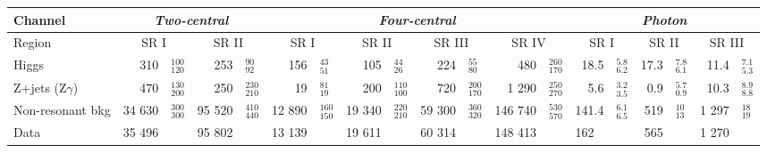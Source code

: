 \documentclass[PAPER, american,coverpage,texlive=2016, english]{\ATLASLATEXPATH atlasdoc}
\providecommand{\DIFaddendFL}{} %
\begin{document}
\begin{table}[htbp]
{   \begin{tabular}{ l |r@{$^{+}_{-}$}l|r@{$^{+}_{-}$}l|r@{$^{+}_{-}$}l|r@{$^{+}_{-}$}l|r@{$^{+}_{-}$}l|r@{$^{+}_{-}$}l|r@{$^{+}_{-}$}l|r@{$^{+}_{-}$}l|r@{$^{+}_{-}$}l}
\hline
\hline
Channel      & \multicolumn{4}{c|}{\textit{Two-central}} & \multicolumn{8}{c|}{\textit{Four-central}} & \multicolumn{6}{c}{\textit{Photon}} \\ \hline
Region       & \multicolumn{2}{c|}{SR I}           & \multicolumn{2}{c|}{SR II  }         & \multicolumn{2}{c|}{SR I }  & \multicolumn{2}{c|}{SR II} & \multicolumn{2}{c|}{SR III} & \multicolumn{2}{c|}{SR IV}  & \multicolumn{2}{c|}{SR I}  & \multicolumn{2}{c|}{SR II}   & \multicolumn{2}{c}{SR III}   \\
\hline
Higgs & 310&$^{100}_{120}$ & 253&$^{90}_{92}$ & 156&$^{43}_{51}$ & 105&$^{44}_{26}$ & 224&$^{55}_{80}$ & 480&$^{260}_{170}$ & 18.5&$^{5.8}_{6.2}$ & 17.3&$^{7.8}_{6.1}$ & 11.4&$^{7.1}_{5.3}$ \\
Z+jets (Z$\gamma$) & 470&$^{130}_{200}$ & 250&$^{230}_{210}$ & 19&$^{81}_{19}$ & 200&$^{110}_{100}$ & 720&$^{200}_{170}$ & 1 290&$^{250}_{270}$ & 5.6&$^{3.2}_{3.5}$ & 0.9&$^{5.7}_{0.9}$ & 10.3&$^{8.9}_{8.8}$ \\
Non-resonant bkg & 34 630&$^{300}_{300}$ & 95 520&$^{410}_{440}$ & 12 890&$^{160}_{150}$ & 19 340&$^{220}_{210}$ & 59 300&$^{360}_{320}$ & 146 740&$^{530}_{570}$ & 141.4&$^{6.1}_{6.5}$ & 519&$^{10}_{13}$ & 1 297&$^{18}_{19}$ \\
[2px] \hline
Data & \multicolumn{1}{r}{35 496} && \multicolumn{1}{r}{95 802} && \multicolumn{1}{r}{13 139} && \multicolumn{1}{r}{19 611} && \multicolumn{1}{r}{60 314} && \multicolumn{1}{r}{148 413} && \multicolumn{1}{l}{162} && \multicolumn{1}{r}{ 565} && \multicolumn{1}{r}{1 270} \\
\hline
\hline
\end{tabular}}
\DIFaddendFL \end{table}
\end{document}

